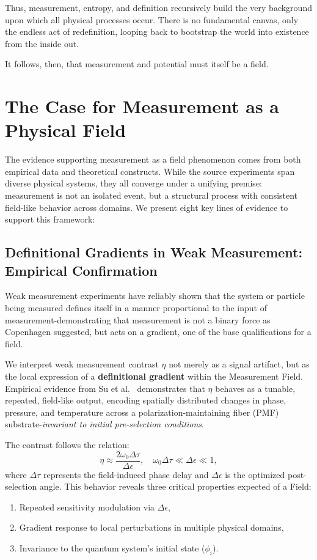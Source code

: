 Thus, measurement, entropy, and definition recursively build the very background upon which all physical processes occur. There is no fundamental canvas, only the endless act of redefinition, looping back to bootstrap the world into existence from the inside out.

It follows, then, that measurement and potential must itself be a field. 

\section{The Case for Measurement as a Physical Field}

The evidence supporting measurement as a field phenomenon comes from both empirical data and theoretical constructs. While the source experiments span diverse physical systems, they all converge under a unifying premise: measurement is not an isolated event, but a structural process with consistent field-like behavior across domains. We present eight key lines of evidence to support this framework:

\subsection*{Definitional Gradients in Weak Measurement: Empirical Confirmation}

Weak measurement experiments have reliably shown that the system or particle being measured defines itself in a manner proportional to the input of measurement-demonstrating that measurement is not a binary force as Copenhagen suggested, but acts on a gradient, one of the base qualifications for a field.

We interpret weak measurement contrast $\eta$ not merely as a signal artifact, but as the local expression of a \textbf{definitional gradient} within the Measurement Field. Empirical evidence from Su et al.~\cite{su2025weak} demonstrates that $\eta$ behaves as a tunable, repeated, field-like output, encoding spatially distributed changes in phase, pressure, and temperature across a polarization-maintaining fiber (PMF) substrate-\textit{invariant to initial pre-selection conditions}.

The contrast follows the relation:
\begin{equation}
\eta \approx \frac{2\omega_0 \Delta\tau}{\Delta\epsilon}, \quad \omega_0 \Delta\tau \ll \Delta\epsilon \ll 1,
\end{equation}
where $\Delta\tau$ represents the field-induced phase delay and $\Delta\epsilon$ is the optimized post-selection angle. This behavior reveals three critical properties expected of a Field:
\begin{enumerate}
    \item Repeated sensitivity modulation via $\Delta\epsilon$,
    \item Gradient response to local perturbations in multiple physical domains,
    \item Invariance to the quantum system's initial state ($\phi_i$).
\end{enumerate}

